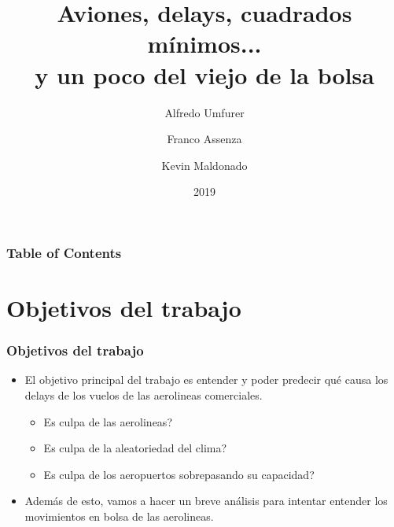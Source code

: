 \documentclass{beamer}
\title{Aviones, delays, cuadrados mínimos...\\ y un poco del viejo de la bolsa}
\author[]{Alfredo Umfurer \and Franco Assenza \and Kevin Maldonado}
\institute{Universidad de Buenos Aires}
\date{2019}
\begin{document}
\frame{\titlepage}

\begin{frame}
\frametitle{Table of Contents}
\tableofcontents
\end{frame}
  
\section{Objetivos del trabajo}\label{sec:objetivos-del-trabajo}
\begin{frame}
\frametitle{Objetivos del trabajo}
\begin{itemize}
\item El objetivo principal del trabajo es entender y poder predecir qué causa los delays de los vuelos de las aerolineas comerciales.\\
\begin{itemize}
\item<1-> Es culpa de las aerolineas?
\item<2-> Es culpa de la aleatoriedad del clima?
\item<3-> Es culpa de los aeropuertos sobrepasando su capacidad?
\end{itemize}
\item<4-> Además de esto, vamos a hacer un breve análisis para intentar entender los movimientos en bolsa de las aerolineas.
\end{itemize}
\end{frame}
 
\end{document}
